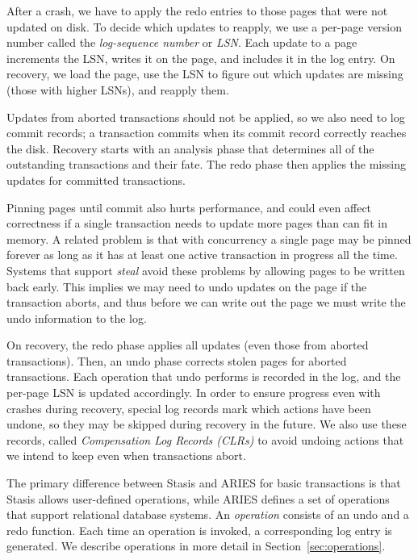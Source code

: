 \documentclass[letterpaper,twocolumn,10pt]{article}
\newcommand{\yad}{Stasis\xspace}
\begin{document}
After a crash, we have to apply the redo entries to those pages that
were not updated on disk.  To decide which updates to reapply, we use
a per-page version number called the {\em log-sequence number} or
{\em LSN}. Each update to a page increments the LSN, writes it on the
page, and includes it in the log entry.  On recovery, we 
load the page, use the LSN to figure out which updates are missing
(those with higher LSNs), and reapply them.

Updates from aborted transactions should not be applied, so we also
need to log commit records; a transaction commits when its commit
record correctly reaches the disk. Recovery starts with an analysis
phase that determines all of the outstanding transactions and their
fate.  The redo phase then applies the missing updates for committed
transactions.

Pinning pages until commit also hurts performance, and could even
affect correctness if a single transaction needs to update more pages
than can fit in memory. A related problem is that with concurrency a
single page may be pinned forever as long as it has at least one
active transaction in progress all the time.  Systems that support
{\em steal} avoid these problems by allowing pages to be written back
early.  This implies we may need to undo updates on the page if the
transaction aborts, and thus before we can write out the page we must
write the undo information to the log. 

On recovery, the redo phase applies all updates (even those from
aborted transactions).  Then, an undo phase corrects stolen pages for
aborted transactions.  Each operation that undo performs is recorded
in the log, and the per-page LSN is updated accordingly.  In order to
ensure progress even with crashes during recovery, special log records
mark which actions have been undone, so they may be skipped during
recovery in the future.  We also use these records, called {\em
Compensation Log Records (CLRs)} to avoid undoing actions that we
intend to keep even when transactions abort.

The primary difference between \yad and ARIES for basic transactions
is that \yad allows user-defined operations, while ARIES defines a set
of operations that support relational database systems.  An {\em
operation} consists of an undo and a redo function.  Each time an
operation is invoked, a corresponding log entry is generated.  We
describe operations in more detail in Section~\ref{sec:operations}.

\end{document}
